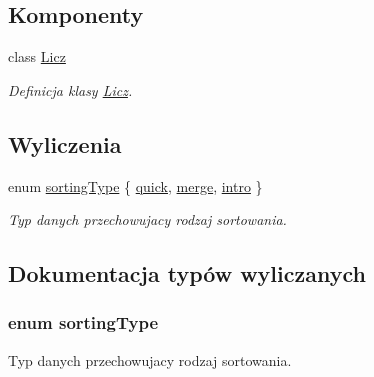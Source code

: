 \subsection*{Komponenty}
\begin{DoxyCompactItemize}
\item 
class \hyperlink{class_licz}{Licz}
\begin{DoxyCompactList}\small\item\em Definicja klasy \hyperlink{class_licz}{Licz}. \end{DoxyCompactList}\end{DoxyCompactItemize}
\subsection*{Wyliczenia}
\begin{DoxyCompactItemize}
\item 
enum \hyperlink{licz_8hh_a08f516d96c62462f77e4e83d222bfdfb}{sorting\-Type} \{ \hyperlink{licz_8hh_a08f516d96c62462f77e4e83d222bfdfba6e0cfea25efd107a876dcc7bf7b922c7}{quick}, 
\hyperlink{licz_8hh_a08f516d96c62462f77e4e83d222bfdfba47a79557511ab5d9be9b553a1be1872b}{merge}, 
\hyperlink{licz_8hh_a08f516d96c62462f77e4e83d222bfdfba9f059e6c3769afddef00542fed4102dd}{intro}
 \}
\begin{DoxyCompactList}\small\item\em Typ danych przechowujacy rodzaj sortowania. \end{DoxyCompactList}\end{DoxyCompactItemize}


\subsection{Dokumentacja typów wyliczanych}
\hypertarget{licz_8hh_a08f516d96c62462f77e4e83d222bfdfb}{
\subsubsection[{sorting\-Type}]{\setlength{\rightskip}{0pt plus 5cm}enum {\bf sorting\-Type}}}\label{licz_8hh_a08f516d96c62462f77e4e83d222bfdfb}


Typ danych przechowujacy rodzaj sortowania. 


